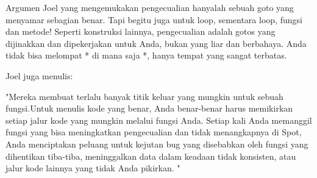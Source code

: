 \vspace{12pt}
Argumen Joel yang mengemukakan pengecualian hanyalah sebuah goto yang menyamar sebagian benar. Tapi begitu juga untuk loop, sementara loop, fungsi dan metode! Seperti konstruksi lainnya, pengecualian adalah gotos yang dijinakkan dan dipekerjakan untuk Anda, bukan yang liar dan berbahaya. Anda tidak bisa melompat * di mana saja *, hanya tempat yang sangat terbatas. \par
\vspace{12pt}
Joel juga menulis: \par
\vspace{12pt}
"Mereka membuat terlalu banyak titik keluar yang mungkin untuk sebuah fungsi.Untuk menulis kode yang benar, Anda benar-benar harus memikirkan setiap jalur kode yang mungkin melalui fungsi Anda. Setiap kali Anda memanggil fungsi yang bisa meningkatkan pengecualian dan tidak menangkapnya di Spot, Anda menciptakan peluang untuk kejutan bug yang disebabkan oleh fungsi yang dihentikan tiba-tiba, meninggalkan data dalam keadaan tidak konsisten, atau jalur kode lainnya yang tidak Anda pikirkan. " \par
\vspace{12pt}
\vspace{12pt}
\vspace{12pt}
